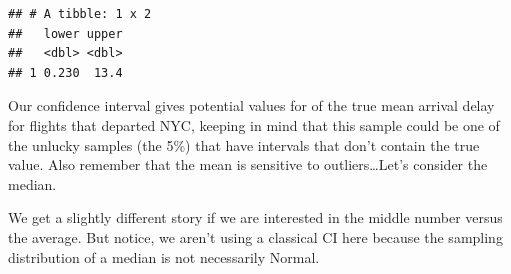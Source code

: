 \documentclass[
]{book}
\newenvironment{Shaded}{\begin{snugshade}}{\end{snugshade}}
\newcommand{\CommentTok}[1]{\textcolor[rgb]{0.56,0.35,0.01}{\textit{#1}}}
\newcommand{\DataTypeTok}[1]{\textcolor[rgb]{0.13,0.29,0.53}{#1}}
\newcommand{\DecValTok}[1]{\textcolor[rgb]{0.00,0.00,0.81}{#1}}
\newcommand{\FloatTok}[1]{\textcolor[rgb]{0.00,0.00,0.81}{#1}}
\newcommand{\KeywordTok}[1]{\textcolor[rgb]{0.13,0.29,0.53}{\textbf{#1}}}
\newcommand{\NormalTok}[1]{#1}
\newcommand{\OperatorTok}[1]{\textcolor[rgb]{0.81,0.36,0.00}{\textbf{#1}}}
\newcommand{\OtherTok}[1]{\textcolor[rgb]{0.56,0.35,0.01}{#1}}
\newcommand{\StringTok}[1]{\textcolor[rgb]{0.31,0.60,0.02}{#1}}
\begin{document}
\begin{Shaded}
\end{Shaded}

\begin{verbatim}
## # A tibble: 1 x 2
##   lower upper
##   <dbl> <dbl>
## 1 0.230  13.4
\end{verbatim}

Our confidence interval gives potential values for of the true mean arrival delay for flights that departed NYC, keeping in mind that this sample could be one of the unlucky samples (the 5\%) that have intervals that don't contain the true value. Also remember that the mean is sensitive to outliers\ldots Let's consider the median.

We get a slightly different story if we are interested in the middle number versus the average. But notice, we aren't using a classical CI here because the sampling distribution of a median is not necessarily Normal.

\begin{Shaded}
\end{Shaded}
\end{document}
